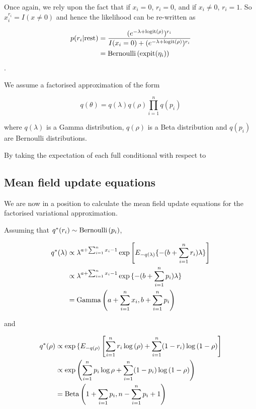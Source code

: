 \documentclass{amsart}
\begin{document}
Once again, we rely upon the fact that if $x_i = 0$, $r_i = 0$, and if $x_i \ne 0$,
$r_i = 1$. So $x_i^{r_i} = I(x \ne 0)$ and hence the likelihood can be re-written as

\begin{align*}
p(r_i | \text{rest}) &= \frac{(e^{-\lambda + \text{logit} \left( \rho \right)})^{r_i}}{I(x_i = 0) + (e^{-\lambda + \text{logit} \left( \rho \right)})^{r_i}} \\
&= \text{Bernoulli} \left( \text{expit}(\eta_i) \right)
\end{align*}.


We assume a factorised approximation of the form

$$
q(\theta) = q(\lambda) q(\rho) \prod_{i=1}^n q(p_i)
$$

where $q(\lambda)$ is a Gamma distribution, $q(\rho)$ is a Beta distribution and
$q(p_i)$ are Bernoulli distributions.

By taking the expectation of each full conditional with respect to 

\subsection{Mean field update equations}
We are now in a position to calculate the mean field update equations for the factorised
variational approximation.

Assuming that $q^*(r_i) \sim \text{Bernoulli} \left( p_i \right)$,

\begin{align*}
q^*(\lambda) &\propto \lambda^{a+\sum_{i=1}^n x_i - 1} \exp{\left[ E_{-q(\lambda)} \{-(b + \sum_{i=1}^n r_i) \lambda \} \right]} \\
&\propto \lambda^{a+\sum_{i=1}^n x_i - 1} \exp{\{-(b + \sum_{i=1}^n p_i)\lambda \} } \\
&= \text{Gamma} \left( a+\sum_{i=1}^n x_i, b + \sum_{i=1}^n p_i \right)
\end{align*}

and

\begin{align*}
q^*(\rho) &\propto \exp{\{ E_{-q(\rho)} \left[ \sum_{i=1}^n r_i \log{(\rho)} + \sum_{i=1}^n (1- r_i) \log{(1 - \rho)} \right] } \\
&\propto \exp{ \left( \sum_{i=1}^n p_i \log{\rho} + \sum_{i=1}^n (1 - p_i) \log{(1 - \rho)} \right) } \\
&= \text{Beta} \left( 1+ \sum_{i=1} p_i, n - \sum_{i=1}^n p_i + 1 \right)
\end{align*}
\end{document}
